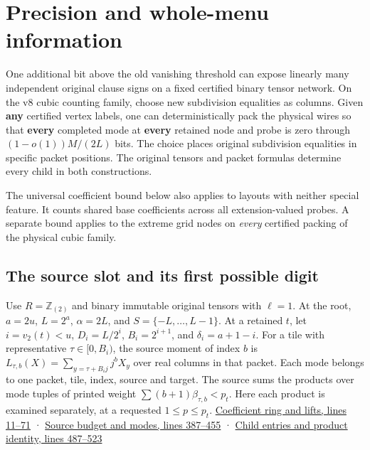 \documentclass[11pt,a4paper]{article}
\begin{document}
\section{Precision and whole-menu
information}\label{v9-section-precision-frontier}

One additional bit above the old vanishing threshold can expose linearly
many independent original clause signs on a fixed certified binary
tensor network. On the v8 cubic counting family, choose new subdivision
equalities as columns. Given \textbf{any} certified vertex labels, one
can deterministically pack the physical wires so that \textbf{every}
completed mode at \textbf{every} retained node and probe is zero through
\((1-o(1))M/(2L)\) bits. The choice places original subdivision
equalities in specific packet positions. The original tensors and packet
formulas determine every child in both constructions.

The universal coefficient bound below also applies to layouts with
neither special feature. It counts shared base coefficients across all
extension-valued probes. A separate bound applies to the extreme grid
nodes on \emph{every} certified packing of the physical cubic family.

\subsection{The source slot and its first possible
digit}\label{v9-the-source-slot-and-its-first-possible-digit}

Use \(R=\mathbb Z_{(2)}\) and binary immutable original tensors with
\(\ell=1\). At the root, \(a=2u\), \(L=2^a\), \(\alpha=2L\), and
\(S=\{-L,\ldots,L-1\}\). At a retained \(t\), let \(i=v_2(t)<u\),
\(D_i=L/2^i\), \(B_i=2^{i+1}\), and \(\delta_i=a+1-i\). For a tile with
representative \(\tau\in[0,B_i)\), the source moment of index \(b\) is
\(L_{\tau,b}(X)=\sum_{y=\tau+B_i j}j^b X_y\) over real columns in that
packet. Each mode belongs to one packet, tile, index, source and target.
The source sums the products over mode tuples of printed weight
\(\sum(b+1)\beta_{\tau,b}<p_t\). Here each product is examined
separately, at a requested \(1\le p\le p_t\).
\href{https://github.com/openai/math/blob/main/preprints/The-Exponential-Time-Hypothesis-is-False-October-25-2026/build/quantitative-contraction.tex\#L11}{Coefficient
ring and lifts, lines 11--71} ·
\href{https://github.com/openai/math/blob/main/preprints/The-Exponential-Time-Hypothesis-is-False-October-25-2026/build/quantitative-contraction.tex\#L387}{Source
budget and modes, lines 387--455} ·
\href{https://github.com/openai/math/blob/main/preprints/The-Exponential-Time-Hypothesis-is-False-October-25-2026/build/quantitative-contraction.tex\#L487}{Child
entries and product identity, lines 487--523}
\end{document}
